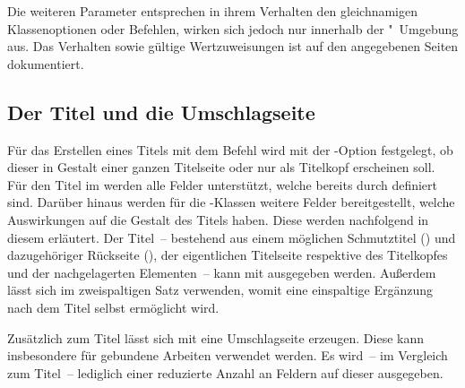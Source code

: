 \begin{DeclareEntity*}{}
\begin{DeclareEntity*}{}
\begin{DeclareEntity*}{}
\begin{Declaration}
\begin{Declaration}
\begin{Declaration}
\begin{Declaration}
\begin{Declaration}
\begin{Declaration}
\begin{Declaration}
\begin{Declaration}
\begin{Declaration}
\begin{Declaration}
\begin{Declaration}
\begin{Declaration}
Die weiteren Parameter entsprechen in ihrem Verhalten den gleichnamigen 
Klassenoptionen oder Befehlen, wirken sich jedoch nur innerhalb der 
"~Umgebung aus. Das Verhalten sowie gültige 
Wertzuweisungen ist auf den angegebenen Seiten dokumentiert.
\end{Declaration}
\end{Declaration}
\end{Declaration}
\end{Declaration}
\end{Declaration}
\end{Declaration}
\end{Declaration}
\end{Declaration}
\end{Declaration}
\end{Declaration}
\end{Declaration}
\end{Declaration}



\subsection{%
  Der Titel und die Umschlagseite%
  \label{sec:title}%
}
%
%
Für das Erstellen eines Titels mit dem Befehl  wird mit der 
\KOMAScript-Option  festgelegt, ob dieser in Gestalt einer 
ganzen Titelseite oder nur als Titelkopf erscheinen soll. Für den Titel im 
\TUDCD werden alle Felder unterstützt, welche bereits durch \KOMAScript 
definiert sind. Darüber hinaus werden für die \TUDScript-Klassen weitere Felder 
bereitgestellt, welche Auswirkungen auf die Gestalt des Titels haben. Diese 
werden nachfolgend in diesem \autorefname erläutert. Der Titel~-- bestehend aus 
einem möglichen Schmutztitel () und dazugehöriger Rückseite 
(), der eigentlichen Titelseite 
respektive des Titelkopfes und der nachgelagerten Elementen~-- kann mit 
 ausgegeben werden. Außerdem lässt sich im zweispaltigen Satz 
 verwenden, womit eine einspaltige Ergänzung nach dem 
Titel selbst ermöglicht wird.

Zusätzlich zum Titel lässt sich mit  eine Umschlagseite 
erzeugen. Diese kann insbesondere für gebundene Arbeiten verwendet werden. Es 
wird~-- im Vergleich zum Titel~-- lediglich einer reduzierte Anzahl an Feldern 
auf dieser ausgegeben.


\end{DeclareEntity*}
\end{DeclareEntity*}
\end{DeclareEntity*}
